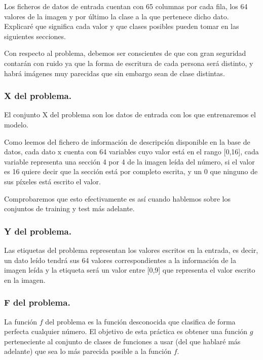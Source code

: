 \documentclass[12pt, spanish]{article}
\begin{document}
Los ficheros de datos de entrada cuentan con 65 columnas por cada fila, los 64 valores de la imagen y por último la clase a la que pertenece dicho dato. Explicaré que significa cada valor y que clases posibles pueden tomar en las siguientes secciones.

Con respecto al problema, debemos ser conscientes de que con gran seguridad contarán con ruido ya que la forma de escritura de cada persona será distinto, y habrá imágenes muy parecidas que sin embargo sean de clase distintas.

\subsubsection{X del problema.}

El conjunto X del problema son los datos de entrada con los que entrenaremos el modelo. 

Como leemos del fichero de información de descripción disponible en la base de datos\cite{mlr_digitos}, cada dato x cuenta con 64 variables cuyo valor está en el rango [0,16], cada variable representa una sección 4 por 4 de la imagen leída del número, si el valor es 16 quiere decir que la sección está por completo escrita, y un 0 que ninguno de sus píxeles está escrito el valor.

Comprobaremos que esto efectivamente es así cuando hablemos sobre los conjuntos de training y test más adelante.

\subsubsection{Y del problema.}

Las etiquetas del problema representan los valores escritos en la entrada, es decir, un dato leído tendrá sus 64 valores correspondientes a la información de la imagen leída y la etiqueta será un valor entre [0,9] que representa el valor escrito en la imagen.

\subsubsection{F del problema.}

La función $f$ del problema es la función desconocida que clasifica de forma perfecta cualquier número. El objetivo de esta práctica es obtener una función $g$ perteneciente al conjunto de clases de funciones a usar (del que hablaré más adelante) que sea lo más parecida posible a la función $f$.
\end{document}
